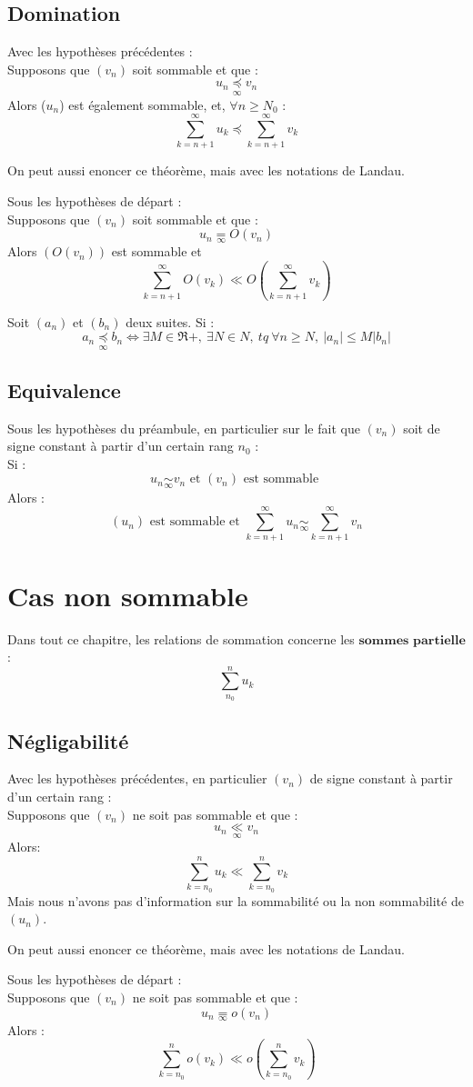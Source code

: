 \subsection{Domination}
\begin{theo}
Avec les hypothèses précédentes :\\
Supposons que $(v_n)$ soit sommable et que  :
$$u_n \underset{\infty}\preccurlyeq v_n$$
Alors ($u_n$) est également sommable, et, $\forall n \geq N_0$ : 
$$\sum_{k=n+1}^{\infty} u_k \preccurlyeq \sum_{k=n+1}^{\infty} v_k$$
\end{theo}
On peut aussi enoncer ce théorème, mais avec les notations de Landau.
\begin{theo}
Sous les hypothèses de départ : \\
Supposons que $(v_n)$ soit sommable et que : 
$$u_n \underset{\infty}= O(v_n) $$
Alors $(O(v_n))$ est sommable et 
$$\sum_{k=n+1}^{\infty} O(v_k) \ll O(\sum_{k=n+1}^{\infty} v_k)$$
\end{theo}
\begin{prop}
Soit $(a_n)$ et $(b_n)$ deux suites. Si : 
$$a_n \underset{\infty}\preceq b_n \Leftrightarrow \exists M \in \Re{+},~ \exists N \in N,~ tq~ \forall n \geq N,~ |a_n|\leq M|b_n|$$
\end{prop}
\subsection{Equivalence}
Sous les hypothèses du préambule, en particulier sur le fait que $(v_n)$ soit de signe constant à partir d'un certain rang $n_0$ : \\
Si : 
$$u_n \underset{\infty}\sim v_n \mbox{ et } (v_n) \mbox{ est sommable }$$
Alors : 
$$(u_n) \mbox{ est sommable et } \sum_{k=n+1}^{\infty}u_n \underset{\infty}\sim \sum_{k=n+1}^{\infty}v_n$$
\section{Cas non sommable}
Dans tout ce chapitre, les relations de sommation concerne les $\textbf{sommes partielle}$ : 
$$\sum_{n_0}^n u_k$$
\subsection{Négligabilité}
\begin{theo}
Avec les hypothèses précédentes, en particulier $(v_n)$ de signe constant à partir d'un certain rang :\\
Supposons que $(v_n)$ ne soit pas sommable et que  :
$$u_n \underset{\infty}\ll v_n$$
Alors: 
$$\sum_{k=n_0}^{n} u_k \ll \sum_{k=n_0}^{n} v_k$$
Mais nous n'avons pas d'information sur la sommabilité ou la non sommabilité de $(u_n)$.
\end{theo}
On peut aussi enoncer ce théorème, mais avec les notations de Landau.
\begin{theo}
Sous les hypothèses de départ : \\
Supposons que $(v_n)$ ne soit pas sommable et que : 
$$u_n \underset{\infty}= o(v_n) $$
Alors :
$$\sum_{k=n_0}^{n} o(v_k) \ll o(\sum_{k=n_0}^{n} v_k)$$
\end{theo}
